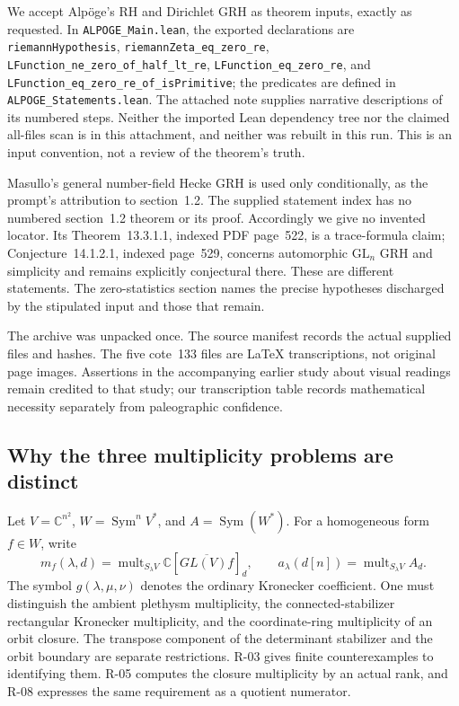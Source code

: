 \documentclass[11pt,a4paper]{article}
\theoremstyle{definition}\newtheorem{definition}{Definition}
\begin{document}
We accept Alp\"oge's RH and Dirichlet GRH as theorem inputs, exactly as requested. In \nolinkurl{ALPOGE_Main.lean}, the exported declarations are \nolinkurl{riemannHypothesis}, \nolinkurl{riemannZeta_eq_zero_re}, \nolinkurl{LFunction_ne_zero_of_half_lt_re}, \nolinkurl{LFunction_eq_zero_re}, and \nolinkurl{LFunction_eq_zero_re_of_isPrimitive}; the predicates are defined in \nolinkurl{ALPOGE_Statements.lean}. The attached note supplies narrative descriptions of its numbered steps. Neither the imported Lean dependency tree nor the claimed all-files scan is in this attachment, and neither was rebuilt in this run. This is an input convention, not a review of the theorem's truth.

Masullo's general number-field Hecke GRH is used only conditionally, as the prompt's attribution to section~1.2. The supplied statement index has no numbered section~1.2 theorem or its proof. Accordingly we give no invented locator. Its Theorem~13.3.1.1, indexed PDF page~522, is a trace-formula claim; Conjecture~14.1.2.1, indexed page~529, concerns automorphic $\mathrm{GL}_n$ GRH and simplicity and remains explicitly conjectural there. These are different statements. The zero-statistics section names the precise hypotheses discharged by the stipulated input and those that remain.

The archive was unpacked once. The source manifest records the actual supplied files and hashes. The five cote~133 files are LaTeX transcriptions, not original page images. Assertions in the accompanying earlier study about visual readings remain credited to that study; our transcription table records mathematical necessity separately from paleographic confidence.

\subsection{Why the three multiplicity problems are distinct}

Let $V=\mathbb C^{n^2}$, $W=\operatorname{Sym}^nV^*$, and $A=\operatorname{Sym}(W^*)$. For a homogeneous form $f\in W$, write
\[
 m_f(\lambda,d)=\operatorname{mult}_{S_\lambda V}\mathbb C[\overline{GL(V)f}]_d,
 \qquad a_\lambda(d[n])=\operatorname{mult}_{S_\lambda V}A_d.
\]
The symbol $g(\lambda,\mu,\nu)$ denotes the ordinary Kronecker coefficient. One must distinguish the ambient plethysm multiplicity, the connected-stabilizer rectangular Kronecker multiplicity, and the coordinate-ring multiplicity of an orbit closure. The transpose component of the determinant stabilizer and the orbit boundary are separate restrictions. R-03 gives finite counterexamples to identifying them. R-05 computes the closure multiplicity by an actual rank, and R-08 expresses the same requirement as a quotient numerator.
\end{document}
